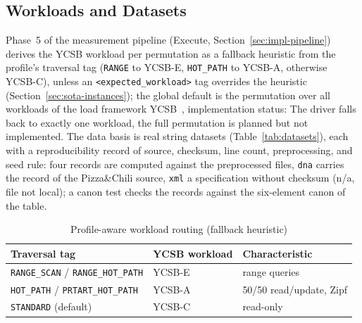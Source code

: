 \begin{nurkurz}
\subsection{Workloads and Datasets}\label{sec:eval-workloads}
Phase~5 of the measurement pipeline (Execute, Section~\ref{sec:impl-pipeline}) derives the YCSB workload per
permutation as a fallback heuristic from the profile's traversal tag (\texttt{RANGE} to YCSB-E,
\texttt{HOT\_PATH} to YCSB-A, otherwise YCSB-C), unless an \texttt{<expected\_workload>} tag overrides the
heuristic (Section~\ref{sec:sota-instances}); the global default is the permutation over all workloads of
the load framework YCSB~\cite{cooper2010ycsb}, implementation status: The driver falls back to exactly one
workload, the full permutation is planned but not implemented. The data basis is real string datasets
(Table~\ref{tab:datasets}), each with a reproducibility record of source, checksum, line count,
preprocessing, and seed rule: four records are computed against the preprocessed files, \texttt{dna}
carries the record of the Pizza\&Chili source, \texttt{xml} a specification without checksum (n/a, file not
local); a canon test checks the records against the six-element canon of the table.
\end{nurkurz}

\begin{nurlang}
\begin{table}[!htbp]
  \centering
  \caption{Profile-aware workload routing (fallback heuristic)}\label{tab:workload-routing}
  \begin{tabular}{lll}
    \toprule
    \textbf{Traversal tag} & \textbf{YCSB workload} & \textbf{Characteristic} \\
    \midrule
    \texttt{RANGE\_SCAN} / \texttt{RANGE\_HOT\_PATH} & YCSB-E & range queries \\
    \texttt{HOT\_PATH} / \texttt{PRTART\_HOT\_PATH} & YCSB-A & 50/50 read/update, Zipf \\
    \texttt{STANDARD} (default) & YCSB-C & read-only \\
    \bottomrule
  \end{tabular}
\end{table}
\end{nurlang}

